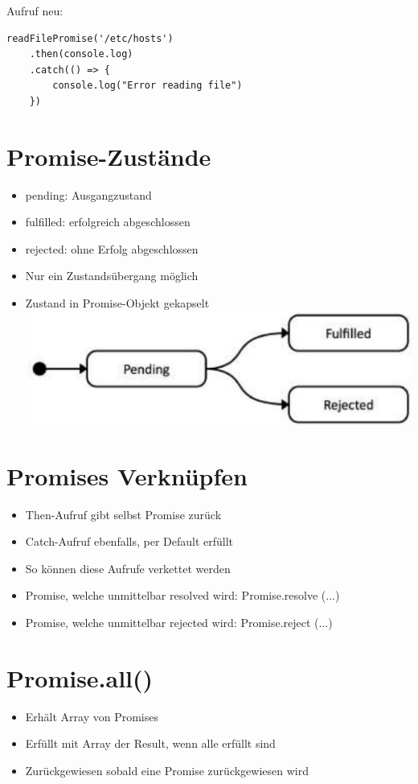 Aufruf neu:

\begin{verbatim}
readFilePromise('/etc/hosts')
    .then(console.log)
    .catch(() => {
        console.log("Error reading file")
    })
\end{verbatim}

\section*{Promise-Zustände}
\begin{itemize}
  \item pending: Ausgangzustand
  \item fulfilled: erfolgreich abgeschlossen
  \item rejected: ohne Erfolg abgeschlossen
  \item Nur ein Zustandsübergang möglich
  \item Zustand in Promise-Objekt gekapselt\\
\includegraphics[width=\linewidth]{images/2024_12_29_858f09cde51177c71657g-14}
\end{itemize}

\section*{Promises Verknüpfen}
\begin{itemize}
  \item Then-Aufruf gibt selbst Promise zurück
  \item Catch-Aufruf ebenfalls, per Default erfüllt
  \item So können diese Aufrufe verkettet werden
  \item Promise, welche unmittelbar resolved wird: Promise.resolve (...)
  \item Promise, welche unmittelbar rejected wird: Promise.reject (...)
\end{itemize}

\section*{Promise.all()}
\begin{itemize}
  \item Erhält Array von Promises
  \item Erfüllt mit Array der Result, wenn alle erfüllt sind
  \item Zurückgewiesen sobald eine Promise zurückgewiesen wird
\end{itemize}

